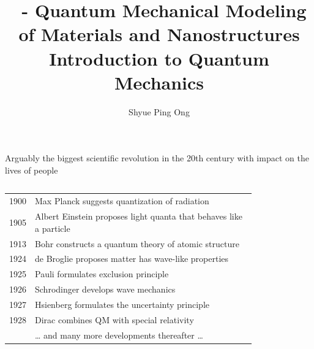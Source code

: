 \documentclass[aspectratio=169]{beamer}
\title[\classname Introduction to Quantum Mechanics]{\classname~- Quantum Mechanical Modeling of Materials and Nanostructures\\Introduction to Quantum Mechanics}
\author{Shyue Ping Ong}
\institute[UCSD]{University of California, San Diego\\
\medskip
}
\date{\classyear} %
\begin{document}
\begin{frame}
    \titlepage %
\end{frame}


\begin{frame}{Arguably the biggest scientific revolution in the 20th century with impact on the lives of people}
\begin{columns}
\begin{tabular}{cl}
\small
1900 & Max Planck suggests quantization of radiation\\
1905 & Albert Einstein proposes light quanta that behaves like a particle\\
1913 & Bohr constructs a quantum theory of atomic structure\\
1924 & de Broglie proposes matter has wave-like properties\\
1925 & Pauli formulates exclusion principle\\
1926 & Schrodinger develops wave mechanics\\
1927 & Hsienberg formulates the uncertainty principle\\
1928 & Dirac combines QM with special relativity\\
& … and many more developments thereafter …
\end{tabular}
\begin{figure}
    \centering

\end{figure}
\end{columns}
\end{frame}
\end{document}
